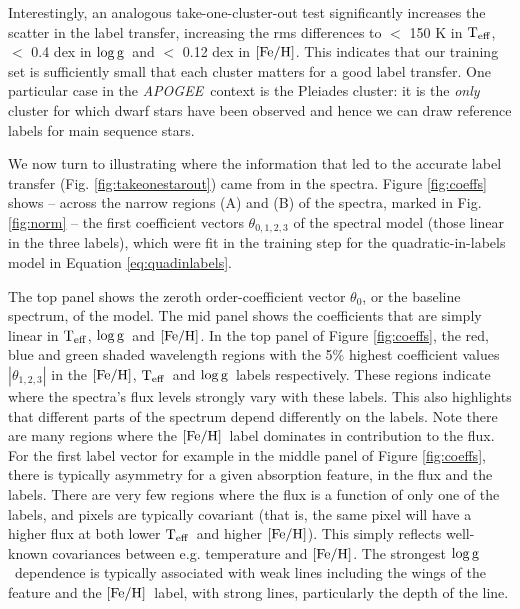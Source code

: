 \documentclass[12pt, preprint]{aastex}
\newcommand{\teff}{\mbox{$\rm T_{eff}$}}
\newcommand{\feh}{\mbox{$\rm [Fe/H]$}}
\newcommand{\logg}{\mbox{$\rm \log g$}}
\newcommand{\apogee}{\textsl{APOGEE}}
\begin{document}
Interestingly, an analogous take-one-cluster-out test significantly increases the scatter in the label transfer, 
increasing the rms differences to $<$ 150 K in \teff, $<$ 0.4 dex in \logg\ and $<$ 0.12 dex in \feh.
This indicates that our training set is sufficiently small that each cluster matters for a good label transfer. 
One particular case in the \apogee\ context is the Pleiades cluster: it is the \textit{only} cluster for which dwarf stars have been observed and hence we can draw reference labels for main sequence stars. 
 
We now turn to illustrating where the information that led to the accurate label transfer (Fig. \ref{fig:takeonestarout}) came from in the spectra.
Figure \ref{fig:coeffs} shows -- across the narrow regions (A) and (B) of the spectra, marked in Fig. \ref{fig:norm} -- the first coefficient vectors $\theta_{0,1,2,3}$ of the spectral model (those linear in the three labels), which were fit in the training step for the quadratic-in-labels model in Equation \ref{eq:quadinlabels}. 


The top panel shows the zeroth order-coefficient vector $\theta_0$, or the baseline spectrum, of the model. 
The mid panel shows the coefficients that are simply linear in \teff, \logg\ and \feh.
In the top panel of Figure \ref{fig:coeffs}, the red, blue and green shaded wavelength regions with the 5\% 
highest coefficient values $|\theta_{1,2,3}|$ in the \feh, \teff\ and \logg\ labels respectively. 
These regions indicate where the spectra's flux levels strongly vary with these labels.
This also highlights that different parts of the spectrum depend differently on the labels. Note there are many regions where the \feh\ label dominates in contribution to the flux.
For the first label vector for example in the middle panel of Figure \ref{fig:coeffs}, 
there is typically asymmetry for a given absorption feature, in the flux and the labels. 
There are very few regions where the flux is a function of only one of the labels, and pixels are typically covariant 
(that is, the same pixel will have a higher flux at both lower \teff\ and higher \feh). 
This simply reflects well-known covariances between e.g. temperature and \feh .
The strongest \logg\ dependence is typically associated with weak lines including the wings of the 
feature and the \feh\ label, with strong lines, particularly the depth of the line. 
\end{document}

